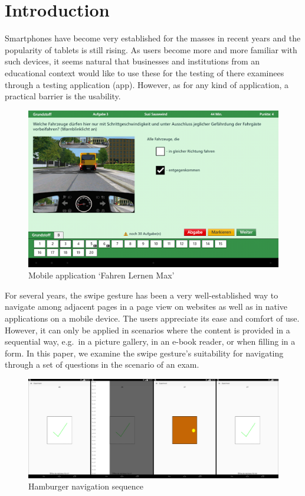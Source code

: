 \documentclass{sig-alternate-05-2015}
\begin{document}
\section{Introduction}
Smartphones have become very established for the masses in recent years and the popularity of tablets is
still rising. As users become more and more familiar with such devices, it seems natural that businesses and institutions
from an educational context would like to use these for the testing of there examinees through a testing application (app).
However, as for any kind of application, a practical barrier is the usability.
\begin{figure}[h]
	\includegraphics[width=\columnwidth]{drivinglicense.png}
	\caption{Mobile application `Fahren Lernen Max'}\label{fig:fahren_lernen}
\end{figure}
For several years, the swipe gesture has been a very well-established way to
navigate among adjacent pages in a page view on websites as well as in native applications on a mobile device. The users appreciate its ease and comfort of use. However,
it can only be applied in scenarios where the content is provided in a
sequential way, e.g.\ in a picture gallery, in an e-book reader, or when
filling in a form. In this paper, we examine the swipe gesture's suitability
for navigating through a set of questions in the scenario of an exam.
\begin{figure}[!h]
	\centering
	\includegraphics[width=\linewidth]{pics/screenshots/sequence}
	\caption{Hamburger navigation sequence}\label{fig:sequence}
\end{figure}
\end{document}
